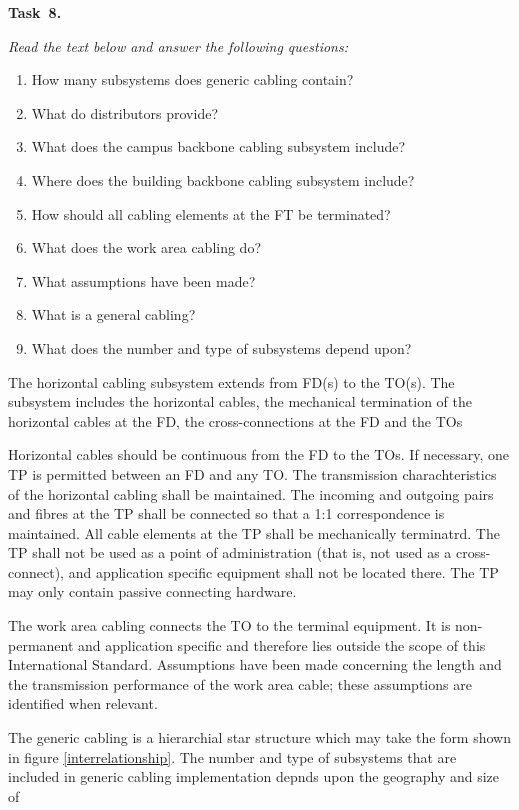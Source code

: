 {\bf Task~8.}~~{\it Read the text below and answer the following questions: \par}

\begin{enumerate}
    \item How many subsystems does generic cabling contain?
    \item What do distributors provide?
    \item What does the campus backbone cabling subsystem include?
    \item Where does the building backbone cabling subsystem include?
    \item How should all cabling elements at the FT be terminated?
    \item What does the work area cabling do?
    \item What assumptions have been made?
    \item What is a general cabling?
    \item What does the number and type of subsystems depend upon?
\end{enumerate}
\par
The horizontal cabling subsystem extends from FD(s) to the TO(s). The subsystem includes the
horizontal cables, the mechanical termination of the horizontal cables at the FD, the cross-connections
at the FD and the TOs\par
Horizontal cables should be continuous from the FD to the TOs. If necessary, one TP is permitted
between an FD and any TO. The transmission charachteristics of the horizontal cabling shall be
maintained. The incoming and outgoing pairs and fibres at the TP shall be connected so that a 1:1
correspondence is maintained. All cable elements at the TP shall be mechanically terminatrd. The TP
shall not be used as a point of administration (that is, not used as a cross-connect), and application
specific equipment shall not be located there. The TP may only contain passive connecting hardware.\par
The work area cabling connects the TO to the terminal equipment. It is non-permanent and
application specific and therefore lies outside the scope of this International Standard. Assumptions
have been made concerning the length and the transmission performance of the work area cable; these
assumptions are identified when relevant.\par
The generic cabling is a hierarchial star structure which may take the form shown in figure \ref{interrelationship}. The
number and type of subsystems that are included in generic cabling implementation depnds upon the geography and size of
